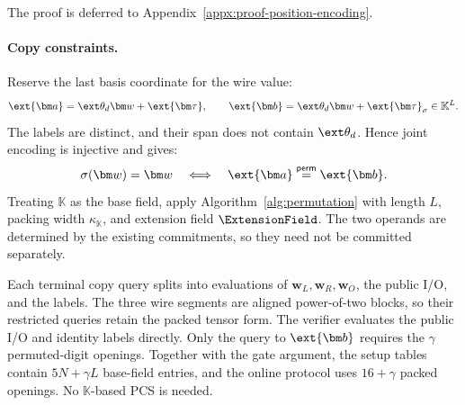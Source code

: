 The proof is deferred to
Appendix~\ref{appx:proof-position-encoding}.

\paragraph{Copy constraints.}
Reserve the last basis coordinate for the wire value:
\begin{equation}
    \ext{\bm a}=\ext\theta_d\bm w+\ext{\bm\tau},
    \qquad
    \ext{\bm b}=\ext\theta_d\bm w+\ext{\bm\tau}_\sigma
       \in\mathbb K^L.
\label{eq:together-copy-operands}
\end{equation}
The labels are distinct, and their span does not contain
\(\ext\theta_d\). Hence joint encoding is injective and gives:
\begin{equation}
    \sigma(\bm w)=\bm w
    \quad\Longleftrightarrow\quad
    \ext{\bm a}\stackrel{\mathsf{perm}}{=}\ext{\bm b}.
\label{eq:together-copy-equivalence}
\end{equation}
Treating \(\mathbb K\) as the base field, apply
Algorithm~\ref{alg:permutation} with length \(L\), packing width
\(\kappa_{\mathbb K}\), and extension field \(\ExtensionField\).
The two operands are determined by the existing commitments,
so they need not be committed separately.

Each terminal copy query splits into evaluations of
\(\bm w_L,\bm w_R,\bm w_O\), the public I/O, and the labels.
The three wire segments are aligned power-of-two blocks, so their
restricted queries retain the packed tensor form.
The verifier evaluates the public I/O and identity labels directly.
Only the query to \(\ext{\bm b}\) requires the \(\gamma\)
permuted-digit openings.
Together with the gate argument, the setup tables contain
\(5N+\gamma L\) base-field entries, and the online protocol uses
\(16+\gamma\) packed openings. No \(\mathbb K\)-based PCS is needed.

